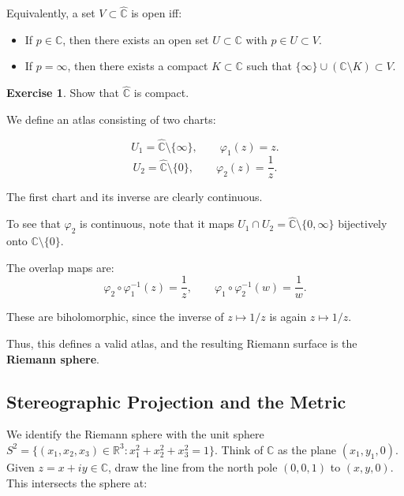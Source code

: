 \documentclass[
]{book}
\theoremstyle{definition}
\theoremstyle{definition}
\theoremstyle{definition}
\newtheorem{exercise}{Exercise}[chapter]
\theoremstyle{definition}
\theoremstyle{remark}
\begin{document}
Equivalently, a set \(V \subset \widehat{\mathbb{C}}\) is open iff:

\begin{itemize}
\item
  If \(p \in \mathbb{C}\), then there exists an open set \(U \subset \mathbb{C}\) with \(p \in U \subset V.\)
\item
  If \(p = \infty\), then there exists a compact \(K \subset \mathbb{C}\) such that \(\{\infty\} \cup (\mathbb{C} \setminus K) \subset V.\)
\end{itemize}

\begin{exercise}
\protect\hypertarget{exr:unnamed-chunk-8}{}\label{exr:unnamed-chunk-8}Show that \(\widehat{\mathbb{C}}\) is compact.
\end{exercise}

We define an atlas consisting of two charts:

\[
U_1 = \widehat{\mathbb{C}} \setminus \{\infty\}, \qquad 
\varphi_1(z) = z.
\]
\[
U_2 = \widehat{\mathbb{C}} \setminus \{0\}, \qquad 
\varphi_2(z) = \frac{1}{z}.
\]

The first chart and its inverse are clearly continuous.

To see that \(\varphi_2\) is continuous, note that it maps \(U_1 \cap U_2 = \widehat{\mathbb{C}} \setminus \{0,\infty\}\) bijectively onto \(\mathbb{C} \setminus \{0\}\).

The overlap maps are:
\[
\varphi_2 \circ \varphi_1^{-1}(z) = \frac{1}{z}, \qquad
\varphi_1 \circ \varphi_2^{-1}(w) = \frac{1}{w}.
\]

These are biholomorphic, since the inverse of \(z \mapsto 1/z\) is again \(z \mapsto 1/z\).

Thus, this defines a valid atlas, and the resulting Riemann surface is the \textbf{Riemann sphere}.

\subsection{Stereographic Projection and the Metric}\label{stereographic-projection-and-the-metric}

We identify the Riemann sphere with the unit sphere \(S^2 = \{(x_1,x_2,x_3) \in \mathbb{R}^3 : x_1^2 + x_2^2 + x_3^2 = 1\}.\) Think of \(\mathbb{C}\) as the plane \((x_1,y_1,0)\). Given \(z = x + iy \in \mathbb{C}\), draw the line from the north pole \((0,0,1)\) to \((x,y,0)\).\\
This intersects the sphere at:
\end{document}
